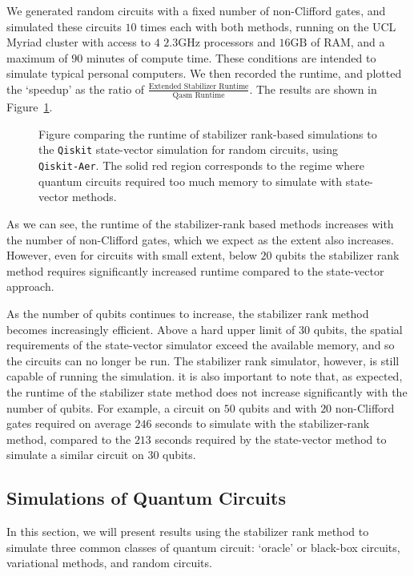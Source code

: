 We generated random circuits with a fixed number of non-Clifford gates, and simulated these circuits $10$ times each with both methods, running on the UCL Myriad cluster with access to $4$ $2.3\mathrm{GHz}$ processors and $16\mathrm{GB}$ of RAM, and a maximum of $90$ minutes of compute time. These conditions are intended to simulate typical personal computers. We then recorded the runtime, and plotted the `speedup' as the ratio of $\frac{\text{Extended Stabilizer Runtime}}{\text{Qasm Runtime}}$. The results are shown in Figure~\ref{fig:qiskit_race}.
\begin{figure}[t]
\centering
\begin{scaletikzpicturetowidth}{0.75\textwidth}
    
\end{scaletikzpicturetowidth}
\caption{Figure comparing the runtime of stabilizer rank-based simulations to the \texttt{Qiskit} state-vector simulation for random circuits, using \texttt{Qiskit-Aer}. The solid red region corresponds to the regime where quantum circuits required too much memory to simulate with state-vector methods.}\label{fig:qiskit_race}
\end{figure}
As we can see, the runtime of the stabilizer-rank based methods increases with the number of non-Clifford gates, which we expect as the extent also increases. However, even for circuits with small extent, below $20$ qubits the stabilizer rank method requires significantly increased runtime compared to the state-vector approach.\par
As the number of qubits continues to increase, the stabilizer rank method becomes increasingly efficient. Above a hard upper limit of $30$ qubits, the spatial requirements of the state-vector simulator exceed the available memory, and so the circuits can no longer be run. The stabilizer rank simulator, however, is still capable of running the simulation. it is also important to note that, as expected, the runtime of the stabilizer state method does not increase significantly with the number of qubits. For example, a circuit on $50$ qubits and with $20$ non-Clifford gates required on average $246$ seconds to simulate with the stabilizer-rank method, compared to the $213$ seconds required by the state-vector method to simulate a similar circuit on $30$ qubits.
\subsection{Simulations of Quantum Circuits}\label{sec:circuit_simulations}
In this section, we will present results using the stabilizer rank method to simulate three common classes of quantum circuit: `oracle' or black-box circuits, variational methods, and random circuits.
